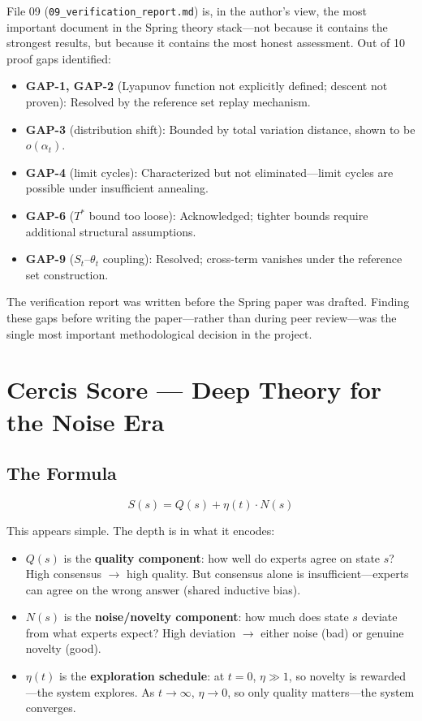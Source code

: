 \documentclass[12pt,a4paper]{ctexart}
\begin{document}
File 09 (\texttt{09\_verification\_report.md}) is, in the author's view, the most important document in the Spring theory stack—not because it contains the strongest results, but because it contains the most honest assessment. Out of 10 proof gaps identified:
\begin{itemize}
\item \textbf{GAP-1, GAP-2} (Lyapunov function not explicitly defined; descent not proven): Resolved by the reference set replay mechanism.
\item \textbf{GAP-3} (distribution shift): Bounded by total variation distance, shown to be $o(\alpha_t)$.
\item \textbf{GAP-4} (limit cycles): Characterized but not eliminated—limit cycles are possible under insufficient annealing.
\item \textbf{GAP-6} ($T^*$ bound too loose): Acknowledged; tighter bounds require additional structural assumptions.
\item \textbf{GAP-9} ($S_t$–$\theta_t$ coupling): Resolved; cross-term vanishes under the reference set construction.
\end{itemize}

The verification report was written before the Spring paper was drafted. Finding these gaps before writing the paper—rather than during peer review—was the single most important methodological decision in the project.

\section{Cercis Score — Deep Theory for the Noise Era}

\subsection{The Formula}
\[
S(s) = Q(s) + \eta(t) \cdot N(s)
\]

This appears simple. The depth is in what it encodes:
\begin{itemize}
\item $Q(s)$ is the \textbf{quality component}: how well do experts agree on state $s$? High consensus $\to$ high quality. But consensus alone is insufficient—experts can agree on the wrong answer (shared inductive bias).
\item $N(s)$ is the \textbf{noise/novelty component}: how much does state $s$ deviate from what experts expect? High deviation $\to$ either noise (bad) or genuine novelty (good).
\item $\eta(t)$ is the \textbf{exploration schedule}: at $t = 0$, $\eta \gg 1$, so novelty is rewarded—the system explores. As $t \to \infty$, $\eta \to 0$, so only quality matters—the system converges.
\end{itemize}
\end{document}
